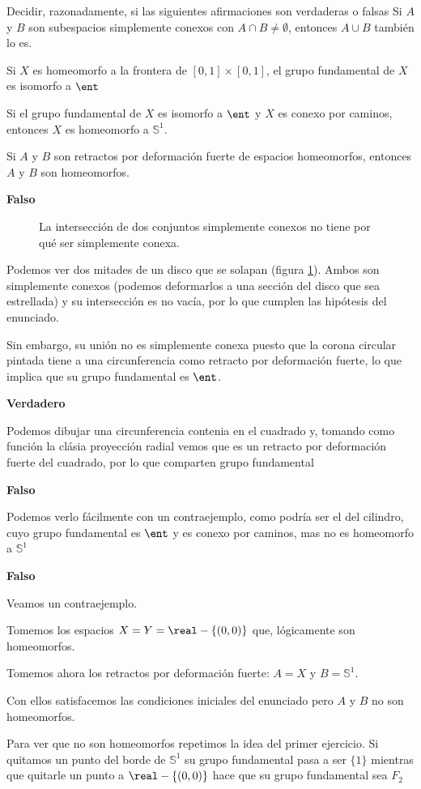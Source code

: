 \begin{problem}[2]
Decidir, razonadamente, si las siguientes afirmaciones son verdaderas o falsas
\ppart Si $A$ y $B$ son subespacios simplemente conexos con $A \cap B \neq \emptyset$, entonces $A \cup B$ también lo es.

\ppart Si $X$ es homeomorfo a la frontera de $[0,1]\times [0,1]$, el grupo fundamental de $X$ es isomorfo a $\ent$

\ppart Si el grupo fundamental de $X$ es isomorfo a $\ent$ y $X$ es conexo por caminos, entonces $X$ es homeomorfo a $\mathbb{S}^1$.

\ppart Si $A$ y $B$ son retractos por deformación fuerte de espacios homeomorfos, entonces $A$ y $B$ son homeomorfos.
\solution

\spart
\textbf{Falso}
\begin{figure}[hbtp]
\centering
{}
\caption{La intersección de dos conjuntos simplemente conexos no tiene por qué ser simplemente conexa.}
\label{figH6E2}
\end{figure}

Podemos ver dos mitades de un disco que se solapan (figura \ref{figH6E2}). Ambos son simplemente conexos (podemos deformarlos a una sección del disco que sea estrellada) y su intersección es no vacía, por lo que cumplen las hipótesis del enunciado.

Sin embargo, su unión no es simplemente conexa puesto que la corona circular pintada tiene a una circunferencia como retracto por deformación fuerte, lo que implica que su grupo fundamental es $\ent$.

\spart
\textbf{Verdadero}

Podemos dibujar una circunferencia contenia en el cuadrado y, tomando como función la clásia proyección radial vemos que es un retracto por deformación fuerte del cuadrado, por lo que comparten grupo fundamental

\spart
\textbf{Falso}

Podemos verlo fácilmente con un contraejemplo, como podría ser el del cilindro, cuyo grupo fundamental es $\ent$ y es conexo por caminos, mas no es homeomorfo a $\mathbb{S}^1$

\spart
\textbf{Falso}

Veamos un contraejemplo.

Tomemos los espacios $X=Y=\real - \{(0,0)\}$ que, lógicamente son homeomorfos.

Tomemos ahora los retractos por deformación fuerte: $A=X$ y $B=\mathbb{S}^1$.

Con ellos satisfacemos las condiciones iniciales del enunciado pero $A$ y $B$ no son homeomorfos.

\obs Para ver que no son homeomorfos repetimos la idea del primer ejercicio. Si quitamos un punto del borde de $\mathbb{S}^1$ su grupo fundamental pasa a ser $\{1\}$ mientras que quitarle un punto a $\real - \{(0,0)\}$ hace que su grupo fundamental sea $F_2$


\end{problem}

